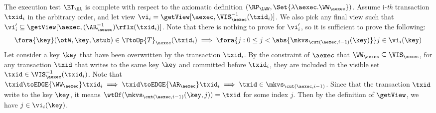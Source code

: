 The execution test $\ET_\UA$ is complete with respect to 
the axiomatic definition \( (\RP_{\LWW}, \Set{\lambda \aexec. \WW_\aexec }) \).
Assume i-\emph{th} transaction \( \txid_i \) in the arbitrary order,
and let view \( \vi_{i} = \getView[\aexec, \VIS^{-1}_{\aexec}(\txid_{i})] \).
We also pick any final view such that \( \vi'_{i} \subseteq \getView[\aexec, (\AR^{-1}_{\aexec})\rflx(\txid_{i})] \).
Note that there is nothing to prove for \( \vi'_i \),
so it is sufficient to prove the following:
\[
    \fora{\key} (\otW, \key, \stub) \in \TtoOp{T}_{\aexec}(\txid_{i}) 
    \implies 
    \fora{j : 0 \leq j < \abs{\mkvs_{\cut(\aexec, i-1)}(\key)}} j \in \vi_i(\key)
\]
Let consider a key \( \key \) that have been overwritten by the transaction \( \txid_i \).
By the constraint of \( \aexec \) that \( \WW_\aexec \subseteq \VIS_\aexec \),
for any transaction \( \txid \) that writes to the same key \( \key \) and committed before \( \txid_i \), 
they are included in the visible set \(\txid \in \VIS^{-1}_{\aexec}(\txid_{i}) \).
Note that \( \txid \toEDGE{\WW_\aexec} \txid_i \implies \txid \toEDGE{\AR_\aexec} \txid_i \implies \txid \in \mkvs_{\cut(\aexec,i-1)}\).
Since that the transaction \( \txid \) write to the key \( \key \),
it means \( \wtOf(\mkvs_{\cut(\aexec, i-1)}(\key,j)) = \txid \) for some index \( j \).
Then by the definition of \( \getView \), we have \( j \in \vi_i(\key)\).
